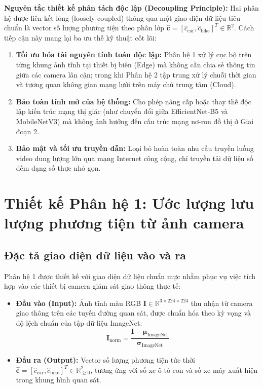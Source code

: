 \textbf{Nguyên tắc thiết kế phân tách độc lập (Decoupling Principle):}
Hai phân hệ được liên kết lỏng (loosely coupled) thông qua một giao diện dữ liệu tiêu chuẩn là vector số lượng phương tiện theo phân lớp $\hat{\mathbf{c}} = [\hat{c}_{\text{car}}, \hat{c}_{\text{bike}}]^T \in \mathbb{R}^2$. Cách tiếp cận này mang lại ba ưu thế kỹ thuật cốt lõi:
\begin{enumerate}
    \item \textbf{Tối ưu hóa tài nguyên tính toán độc lập:} Phân hệ 1 xử lý cục bộ trên từng khung ảnh tĩnh tại thiết bị biên (Edge) mà không cần chia sẻ thông tin giữa các camera lân cận; trong khi Phân hệ 2 tập trung xử lý chuỗi thời gian và tương quan không gian mạng lưới trên máy chủ trung tâm (Cloud).
    \item \textbf{Bảo toàn tính mở của hệ thống:} Cho phép nâng cấp hoặc thay thế độc lập kiến trúc mạng thị giác (như chuyển đổi giữa EfficientNet-B5 và MobileNetV3) mà không ảnh hưởng đến cấu trúc mạng nơ-ron đồ thị ở Giai đoạn 2.
    \item \textbf{Bảo mật và tối ưu truyền dẫn:} Loại bỏ hoàn toàn nhu cầu truyền luồng video dung lượng lớn qua mạng Internet công cộng, chỉ truyền tải dữ liệu số đếm dạng số thực nhỏ gọn.
\end{enumerate}

\section{Thiết kế Phân hệ 1: Ước lượng lưu lượng phương tiện từ ảnh camera}
\label{sec:giai_doan_1_hoi_quy}

\subsection{Đặc tả giao diện dữ liệu vào và ra}
Phân hệ 1 được thiết kế với giao diện dữ liệu chuẩn mực nhằm phục vụ việc tích hợp vào các thiết bị camera giám sát giao thông thực tế:
\begin{itemize}
    \item \textbf{Đầu vào (Input):} Ảnh tĩnh màu RGB $\mathbf{I} \in \mathbb{R}^{3 \times 224 \times 224}$ thu nhận từ camera giao thông trên các tuyến đường quan sát, được chuẩn hóa theo kỳ vọng và độ lệch chuẩn của tập dữ liệu ImageNet:
    \begin{equation}
        \mathbf{I}_{\text{norm}} = \frac{\mathbf{I} - \boldsymbol{\mu}_{\text{ImageNet}}}{\boldsymbol{\sigma}_{\text{ImageNet}}}
    \end{equation}
    \item \textbf{Đầu ra (Output):} Vector số lượng phương tiện tức thời $\hat{\mathbf{c}} = [\hat{c}_{\text{car}}, \hat{c}_{\text{bike}}]^T \in \mathbb{R}^2_{\ge 0}$, tương ứng với số xe ô tô con và số xe máy xuất hiện trong khung hình quan sát.
\end{itemize}

